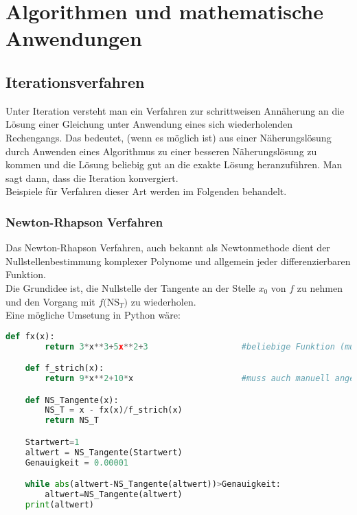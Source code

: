 \section{Algorithmen und mathematische Anwendungen}
\subsection{Iterationsverfahren}
Unter Iteration versteht man ein Verfahren zur schrittweisen Annäherung an die Lösung einer Gleichung unter Anwendung eines sich wiederholenden Rechengangs. Das bedeutet, (wenn es möglich ist) aus einer Näherungslösung durch Anwenden eines Algorithmus zu einer besseren Näherungslösung zu kommen und die Lösung beliebig gut an die exakte Lösung heranzuführen. Man sagt dann, dass die Iteration konvergiert.\\
Beispiele für Verfahren dieser Art werden im Folgenden behandelt.
\subsubsection{Newton-Rhapson Verfahren}
Das Newton-Rhapson Verfahren, auch bekannt als Newtonmethode dient der Nullstellenbestimmung komplexer Polynome und allgemein jeder differenzierbaren Funktion.\\
Die Grundidee ist, die Nullstelle der Tangente an der Stelle $x_0$ von $f$ zu nehmen und den Vorgang mit $f($NS$_T)$ zu wiederholen.\\
Eine mögliche Umsetung in Python wäre:\\
\begin{lstlisting}[language=Python]
	def fx(x):
		return 3*x**3+5x**2+3					#beliebige Funktion (muss angegeben werden)

	def f_strich(x):
		return 9*x**2+10*x						#muss auch manuell angegeben werden

	def NS_Tangente(x):
		NS_T = x - fx(x)/f_strich(x)
		return NS_T

	Startwert=1
	altwert = NS_Tangente(Startwert)
	Genauigkeit = 0.00001

	while abs(altwert-NS_Tangente(altwert))>Genauigkeit:
		altwert=NS_Tangente(altwert)
	print(altwert)

\end{lstlisting}
